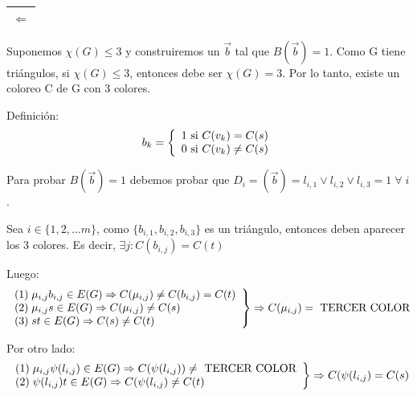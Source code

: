 \documentclass[12pt,a4paper]{report}
\newcounter{neq}
\begin{document}
			\pagebreak
			\begin{tabular}{|c|} \hline $\Leftarrow$ \\\hline \end{tabular}
				\par Suponemos $\chi(G) \leq 3$ y construiremos un $\overrightarrow{b}$ tal que $B(\overrightarrow{b}) = 1$. Como G tiene triángulos, si $\chi (G) \leq 3$, entonces debe ser $\chi (G) = 3$. Por lo tanto, existe un coloreo C de G con 3 colores.
				\vspace{3mm}
				\par Definición:
				\begin{equation*}
					b_{k} =
		  		\left \lbrace
		  		\begin{array}{l}
		    		1 \textup{ si } C(v_{k}) = C(s) \\
		    		0 \textup{ si } C(v_{k}) \neq C(s)
		  		\end{array}
		  		\right.
				\end{equation*}
				\par Para probar $B(\overrightarrow{b}) = 1$ debemos probar que $D_{i} = (\overrightarrow{b}) = l_{i, 1} \vee l_{i, 2} \vee l_{i, 3} = 1 \; \forall \; i$.
				\par Sea $i \in \lbrace	1, 2, \dotsc m \rbrace$, como $ \lbrace b_{i, 1}, b_{i, 2}, b_{i, 3} \rbrace$ es un triángulo, entonces deben aparecer los 3 colores. Es decir, $\exists j : C(b_{i, j}) = C(t)$
				\vspace{3mm}
				\par Luego:
				\begin{equation*}
		  		\left.
		  		\begin{array}{l}
		    		(1) \; \mu_{i, j} b_{i, j} \in E(G) \Rightarrow C(\mu_{i, j}) \neq C(b_{i, j}) = C(t) \\
		    		(2) \; \mu_{i, j} s \in E(G) \Rightarrow C(\mu_{i, j}) \neq C(s) \\
		    		(3) \; s t \in E(G) \Rightarrow C(s) \neq C(t)
		  		\end{array}
		 			\right\rbrace
		 			\Rightarrow C(\mu_{i, j}) = \textup{ TERCER COLOR}
				\end{equation*}

				\par Por otro lado:
				\begin{equation*}
		  		\left.
		  		\begin{array}{l}
		    	 	(1) \; \mu_{i, j} \psi(l_{i, j}) \in E(G) \Rightarrow C(\psi(l_{i, j})) \neq \textup{ TERCER COLOR} \\
		    	 	(2) \; \psi(l_{i, j}) t \in E(G) \Rightarrow C(\psi(l_{i, j}) \neq C(t)
		  		\end{array}
		 		 	\right\rbrace
		 			\Rightarrow C(\psi(l_{i, j}) = C(s)
				\end{equation*}
\end{document}
